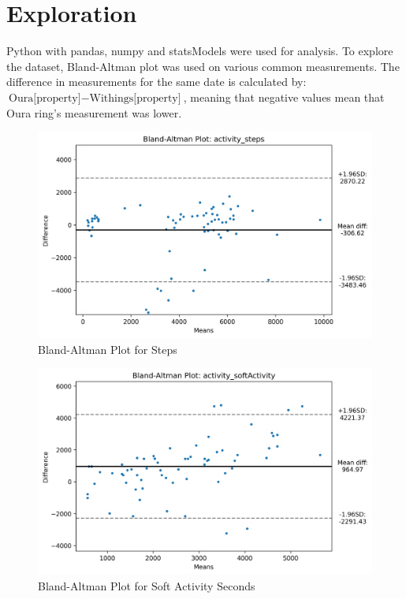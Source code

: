 \section{Exploration}
Python with pandas, numpy and statsModels were used for analysis. To explore the dataset, Bland-Altman plot was used on various common measurements. The difference in measurements for the same date is calculated by: $\text{Oura[property]} - \text{Withings[property]}$, meaning that negative values mean that Oura ring's measurement was lower.
\begin{figure}
    
    \centering
    \includegraphics[width=\textwidth,keepaspectratio]{../images/bland_altman_steps.png}
    \caption{Bland-Altman Plot for Steps}
    \label{fig:blandAltmanSteps}
    
\end{figure}
\begin{figure}
    
    \centering
    \includegraphics[width=\textwidth,keepaspectratio]{../images/bland_altman_softActivity.png}
    \caption{Bland-Altman Plot for Soft Activity Seconds}
    \label{fig:blandAltmanSoftActivity}
    
\end{figure}
